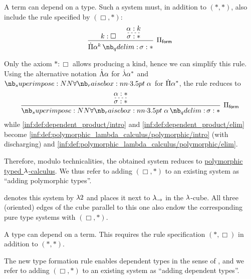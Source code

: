 \begin{definition}
\begin{thmenum}
     A term can depend on a type. Such a system must, in addition to \( (\ast, \ast) \), also include the rule specified by \( (\Box, \ast) \):
    \begin{equation*}
      \begin{prooftree}
        \hypo{ k: \Box }

        \hypo{ \alpha: k }
        \infer[dashed]1{ \sigma: \ast }

        \infer2[\ensuremath{ \Pi_{\logic{form}} }]{ \qprod {\alpha^k} \sigma: \ast }.
      \end{prooftree}
    \end{equation*}

    Only the axiom \( \ast: \Box \) allows producing a kind, hence we can simplify this rule. Using the alternative notation \( \dot{\Lambda} \alpha \) for \( \dot{{\mathrm \lambda}} {\alpha^\ast} \) and \( \synforall \alpha \) for \( \dot{\Pi} {\alpha^\ast} \), the rule reduces to
    \begin{equation*}
      \begin{prooftree}
        \hypo{ \alpha: \ast }
        \infer[dashed]1{ \sigma: \ast }

        \infer1[\ensuremath{ \Pi_{\logic{form}} }]{ \qforall \alpha \sigma: \ast },
      \end{prooftree}
    \end{equation*}
    while \ref{inf:def:dependent_product/intro} and \ref{inf:def:dependent_product/elim} become \ref{inf:def:polymorphic_lambda_calculus/polymorphic/intro} (with discharging) and \ref{inf:def:polymorphic_lambda_calculus/polymorphic/elim}.

    Therefore, modulo technicalities, the obtained system reduces to \hyperref[def:polymorphic_typed_lambda_calculus]{polymorphic typed \( {\mathrm \lambda} \)-calculus}. We thus refer to adding \( (\Box, \ast) \) to an existing system as \enquote{adding polymorphic types}.

     denotes this system by \( {\mathrm \lambda} 2 \) and places it next to \( {\mathrm \lambda}_{\rightarrow} \) in the \( {\mathrm \lambda} \)-cube. All three (oriented) edges of the cube parallel to this one also endow the corresponding pure type systems with \( (\Box, \ast) \).

     A type can depend on a term. This requires the rule specification \( (\ast, \Box) \) in addition to \( (\ast, \ast) \).

    The new type formation rule enables dependent types in the sense of , and we refer to adding \( (\Box, \ast) \) to an existing system as \enquote{adding dependent types}.


\end{thmenum}
\end{definition}
